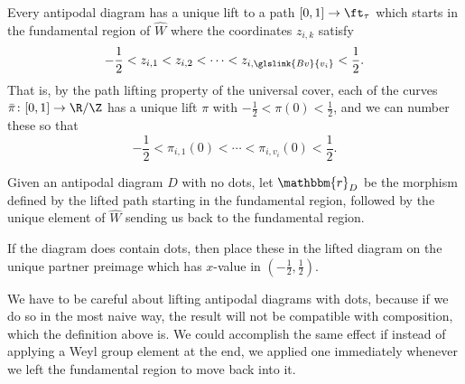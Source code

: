 Every antipodal diagram has a unique lift to a path $[0,1]\to \ft_{\tau}$ which starts in the fundamental region of $\widehat{W}$ where the coordinates $z_{i,k}$ satisfy
\begin{equation}
    -\frac{1}{2}< z_{i,1}<z_{i,2}<\cdots < z_{i,\glslink{Bv}{v_i}}<\frac{1}{2}.  
\end{equation}
That is, by the path lifting property of the universal cover, each of the curves $\bar{\pi}\colon [0,1]\to \R/\Z$ has a unique lift $\pi$ with $-\frac{1}{2}<\pi(0)<\frac{1}{2}$, and we can number these so that \begin{equation}
    -\frac{1}{2}<\pi_{i,1}(0)<\cdots <\pi_{i,v_i}(0)<\frac{1}{2}.
\end{equation} 
\begin{definition}\label{def:antipodal-r}
 Given an antipodal diagram $D$ with no dots, let $\mathbbm{r}_D$ be the morphism defined by the lifted path starting in the fundamental region, followed by the unique element of $\widehat{W}$ sending us back to the fundamental region.    
 
 If the diagram does contain dots, then place these in the lifted diagram on the unique partner preimage which has $x$-value in $(-\frac{1}{2}, \frac{1}{2} )$.
\end{definition}
We have to be careful about lifting antipodal diagrams with dots,
because if we do so in the most naive way, the result will not be
compatible with composition, which the definition above is.  We could accomplish the same effect if instead of 
applying a Weyl group element at the end, we  applied one
immediately whenever we left the fundamental region to move back into
it.  

